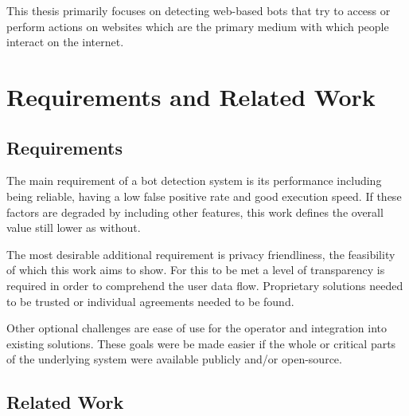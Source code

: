 \documentclass[
    fontsize=12pt,
    headings=small,
    parskip=half,           %
    bibliography=totoc,
    numbers=noenddot,       %
    open=any,               %
    final                   %
]{scrreprt}
\begin{document}
This thesis primarily focuses on detecting web-based bots that try to access or perform actions on websites which are the primary medium with which people interact on the internet.


\chapter{Requirements and Related Work}


\section{Requirements}

The main requirement of a bot detection system is its performance including being reliable, having a low false positive rate and good execution speed. If these factors are degraded by including other features, this work defines the overall value still lower as without.

The most desirable additional requirement is privacy friendliness, the feasibility of which this work aims to show. For this to be met a level of transparency is required in order to comprehend the user data flow. Proprietary solutions needed to be trusted or individual agreements needed to be found.

Other optional challenges are ease of use for the operator and integration into existing solutions. These goals were be made easier if the whole or critical parts of the underlying system were available publicly and/or open-source.

\section{Related Work}
\end{document}

